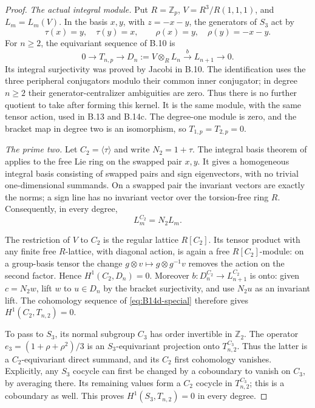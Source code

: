 \begin{proof}
\emph{The actual integral module.}
Put $R=\mathbb Z_p$, $V=R^3/R(1,1,1)$, and $L_m=L_m(V)$.
In the basis $x,y$, with $z=-x-y$, the generators of $S_3$
act by
\[
 \tau(x)=y,\quad\tau(y)=x,
 \qquad \rho(x)=y,\quad\rho(y)=-x-y.
\]
For $n\geq2$, the equivariant sequence of B.10 is
\begin{equation}\label{eq:B14d-special}
 0\longrightarrow T_{n,p}\longrightarrow
 D_n:=V\otimes_R L_n\xrightarrow{b}L_{n+1}
 \longrightarrow0.
\end{equation}
Its integral surjectivity was proved by Jacobi in B.10.
The identification uses the three peripheral conjugators
modulo their common inner conjugator; in degree $n\geq2$
their generator-centralizer ambiguities are zero. Thus
there is no further quotient to take after forming this
kernel. It is the same module, with the same tensor
action, used in B.13 and B.14c. The degree-one module
is zero, and the bracket map in degree two is an
isomorphism, so $T_{1,p}=T_{2,p}=0$.

\emph{The prime two.}
Let $C_2=\langle\tau\rangle$ and write $N_2=1+\tau$.
The integral basis theorem of
\citet[Theorem 2, pp.~15--16]{BryantKovacsStohr2002InvariantBases}
applies to the free Lie ring on the swapped pair $x,y$.
It gives a homogeneous integral basis consisting of
swapped pairs and sign eigenvectors, with no trivial
one-dimensional summands. On a swapped pair the invariant
vectors are exactly the norms; a sign line has no
invariant vector over the torsion-free ring $R$.
Consequently, in every degree,
\begin{equation}\label{eq:B14d-norm2}
 L_m^{C_2}=N_2L_m.
\end{equation}

The restriction of $V$ to $C_2$ is the regular lattice
$R[C_2]$. Its tensor product with any finite free
$R$-lattice, with diagonal action, is again a free
$R[C_2]$-module: on a group-basis tensor the change
$g\otimes v\mapsto g\otimes g^{-1}v$ removes the action
on the second factor. Hence $H^1(C_2,D_n)=0$.
Moreover $b:D_n^{C_2}\to L_{n+1}^{C_2}$ is onto:
given $c=N_2w$, lift $w$ to $u\in D_n$ by the bracket
surjectivity, and use $N_2u$ as an invariant lift.
The cohomology sequence of \eqref{eq:B14d-special}
therefore gives $H^1(C_2,T_{n,2})=0$.

To pass to $S_3$, its normal subgroup $C_3$ has order
invertible in $\mathbb Z_2$. The operator
$e_3=(1+\rho+\rho^2)/3$ is an $S_3$-equivariant
projection onto $T_{n,2}^{C_3}$. Thus the latter is a
$C_2$-equivariant direct summand, and its $C_2$ first
cohomology vanishes. Explicitly, any $S_3$ cocycle can
first be changed by a coboundary to vanish on $C_3$, by
averaging there. Its remaining values form a $C_2$
cocycle in $T_{n,2}^{C_3}$; this is a coboundary as well.
This proves $H^1(S_3,T_{n,2})=0$ in every degree.


\end{proof}
